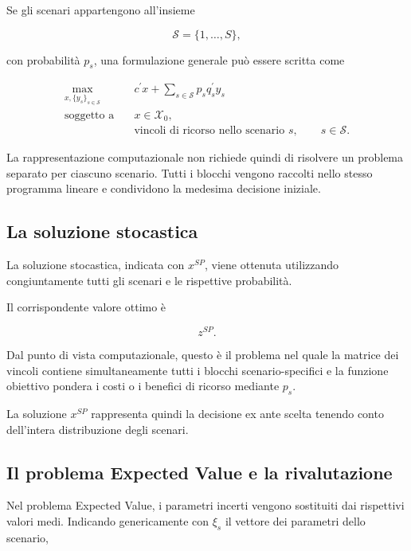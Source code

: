 Se gli scenari appartengono all'insieme

\[
\mathcal{S}
=
\{1,\ldots,S\},
\]

\noindent con probabilit\`a \(p_s\), una formulazione generale pu\`o essere
scritta come


\[
\begin{aligned}
\max_{x,\{y_s\}_{s\in\mathcal S}}\quad&
c^{\prime}x+
\sum_{s\in\mathcal S}p_s q_s^{\prime}y_s\\
\text{soggetto a}\quad&
x\in\mathcal X_0,\\
&\text{vincoli di ricorso nello scenario }s,
\qquad s\in\mathcal S.
\end{aligned}
\]


La rappresentazione computazionale non richiede quindi di risolvere un
problema separato per ciascuno scenario. Tutti i blocchi vengono raccolti
nello stesso programma lineare e condividono la medesima decisione iniziale.

\subsection{La soluzione stocastica}

La soluzione stocastica, indicata con \(x^{SP}\), viene ottenuta utilizzando
congiuntamente tutti gli scenari e le rispettive probabilit\`a.

Il corrispondente valore ottimo \`e

\[
z^{SP}.
\]

Dal punto di vista computazionale, questo \`e il problema nel quale la matrice
dei vincoli contiene simultaneamente tutti i blocchi scenario-specifici e la
funzione obiettivo pondera i costi o i benefici di ricorso mediante \(p_s\).

La soluzione \(x^{SP}\) rappresenta quindi la decisione ex ante scelta tenendo
conto dell'intera distribuzione degli scenari.

\subsection{Il problema Expected Value e la rivalutazione}

Nel problema Expected Value, i parametri incerti vengono sostituiti dai
rispettivi valori medi.
Indicando genericamente con \(\xi_s\) il vettore dei parametri dello scenario,

